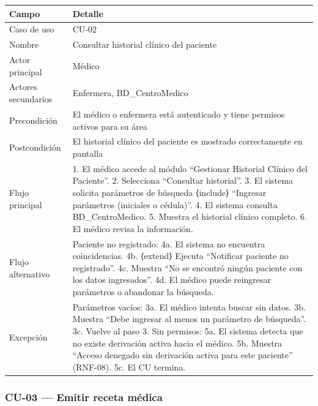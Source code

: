 \documentclass[11pt,a4paper]{article}
\begin{document}
	\begin{longtable}{p{} p{} }
		
		
		\toprule
		\textbf{Campo} &
		\textbf{Detalle}  \\
		\midrule
		\endhead
		
		Caso de uso & CU-02 \\
		Nombre & Consultar historial clínico del paciente \\
		Actor principal & Médico \\
		Actores secundarios & Enfermera, BD\_CentroMedico \\
		Precondición & El médico o enfermera está autenticado y tiene permisos activos para su área \\
		Postcondición & El historial clínico del paciente es mostrado correctamente en pantalla \\
		Flujo principal & 1. El médico accede al módulo ``Gestionar Historial Clínico del Paciente''. 2. Selecciona ``Consultar historial''. 3. El sistema solicita parámetros de búsqueda ⟨include⟩ ``Ingresar parámetros (iniciales o cédula)''. 4. El sistema consulta BD\_CentroMedico. 5. Muestra el historial clínico completo. 6. El médico revisa la información. \\
		Flujo alternativo & Paciente no registrado: 4a. El sistema no encuentra coincidencias. 4b. ⟨extend⟩ Ejecuta ``Notificar paciente no registrado''. 4c. Muestra ``No se encontró ningún paciente con los datos ingresados''. 4d. El médico puede reingresar parámetros o abandonar la búsqueda. \\
		Excepción & Parámetros vacíos: 3a. El médico intenta buscar sin datos. 3b. Muestra ``Debe ingresar al menos un parámetro de búsqueda''. 3c. Vuelve al paso 3. Sin permisos: 5a. El sistema detecta que no existe derivación activa hacia el médico. 5b. Muestra ``Acceso denegado sin derivación activa para este paciente'' (RNF-08). 5c. El CU termina. \\
		
		\bottomrule
	\end{longtable}
	
	\subsubsection{CU-03 --- Emitir receta médica}
	
\end{document}
